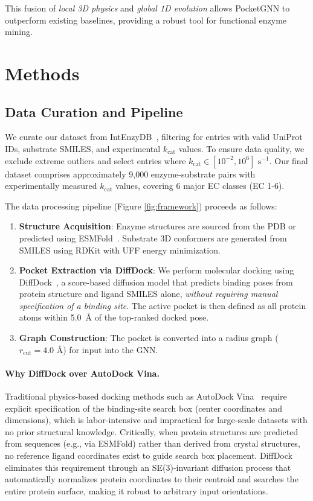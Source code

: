 \documentclass[11pt]{article}
\begin{document}
This fusion of \emph{local 3D physics} and \emph{global 1D evolution} allows PocketGNN to outperform existing baselines, providing a robust tool for functional enzyme mining.

\section{Methods}
\label{sec:methods}

\subsection{Data Curation and Pipeline}
\label{sec:data_pipeline}

We curate our dataset from IntEnzyDB~\citep{yan2022intenzydb}, filtering for entries with valid UniProt IDs, substrate SMILES, and experimental $k_{\text{cat}}$ values. To ensure data quality, we exclude extreme outliers and select entries where $k_{\text{cat}} \in [10^{-2}, 10^{6}] \text{ s}^{-1}$. Our final dataset comprises approximately 9,000 enzyme-substrate pairs with experimentally measured $k_{\text{cat}}$ values, covering 6 major EC classes (EC 1-6).

The data processing pipeline (Figure \ref{fig:framework}) proceeds as follows:
\begin{enumerate}
    \item \textbf{Structure Acquisition}: Enzyme structures are sourced from the PDB or predicted using ESMFold~\citep{esmfold}. Substrate 3D conformers are generated from SMILES using RDKit with UFF energy minimization.
    \item \textbf{Pocket Extraction via DiffDock}: We perform molecular docking using DiffDock~\citep{diffdock2023}, a score-based diffusion model that predicts binding poses from protein structure and ligand SMILES alone, \emph{without requiring manual specification of a binding site}. The active pocket is then defined as all protein atoms within 5.0~\AA{} of the top-ranked docked pose.
    \item \textbf{Graph Construction}: The pocket is converted into a radius graph ($r_{\text{cut}} = 4.0 \text{ \AA}$) for input into the GNN.
\end{enumerate}

\paragraph{Why DiffDock over AutoDock Vina.}
Traditional physics-based docking methods such as AutoDock Vina~\citep{trott2010autodock} require explicit specification of the binding-site search box (center coordinates and dimensions), which is labor-intensive and impractical for large-scale datasets with no prior structural knowledge. Critically, when protein structures are predicted from sequences (e.g., via ESMFold) rather than derived from crystal structures, no reference ligand coordinates exist to guide search box placement. DiffDock eliminates this requirement through an SE(3)-invariant diffusion process that automatically normalizes protein coordinates to their centroid and searches the entire protein surface, making it robust to arbitrary input orientations.
\end{document}

